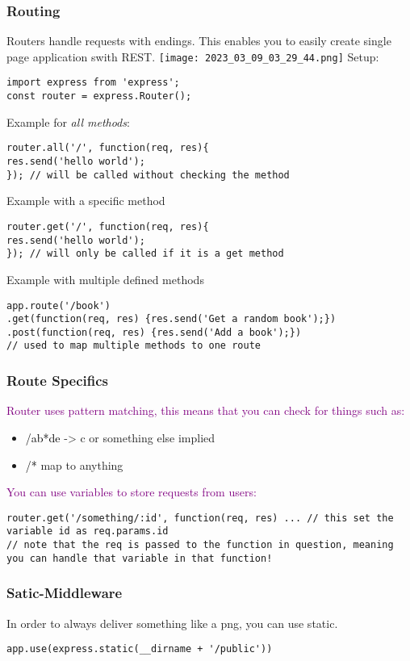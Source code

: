 \documentclass[main.tex,fontsize=8pt,paper=a4,paper=portrait,DIV=calc,]{scrartcl}
\begin{document}
\subsubsection{Routing}
Routers handle requests with endings. This enables you to easily create single page application swith REST.\newline
\texttt{[image: 2023\_03\_09\_03\_29\_44.png]}\newline
Setup:
\begin{lstlisting}
import express from 'express';
const router = express.Router();
\end{lstlisting}
Example for \emph{all methods}:
\begin{lstlisting}
router.all('/', function(req, res){
res.send('hello world');
}); // will be called without checking the method
\end{lstlisting}
Example with a specific method
\begin{lstlisting}
router.get('/', function(req, res){
res.send('hello world');
}); // will only be called if it is a get method
\end{lstlisting}
Example with multiple defined methods
\begin{lstlisting}
app.route('/book')
.get(function(req, res) {res.send('Get a random book');})
.post(function(req, res) {res.send('Add a book');})
// used to map multiple methods to one route
\end{lstlisting}

\subsubsection{Route Specifics}
\textcolor{purple}{Router uses pattern matching, this means that you can check for things such as:}
\begin{itemize}
\item \textcolor{black}{/ab*de} -> c or something else implied
\item \textcolor{black}{/*} map to anything
\end{itemize} 
\textcolor{purple}{You can use variables to store requests from users:}
\begin{lstlisting}
router.get('/something/:id', function(req, res) ... // this set the variable id as req.params.id
// note that the req is passed to the function in question, meaning you can handle that variable in that function!
\end{lstlisting}

\subsubsection{Satic-Middleware}
In order to always deliver something like a png, you can use static.
\begin{lstlisting}
app.use(express.static(__dirname + '/public'))
\end{lstlisting}
\end{document}
